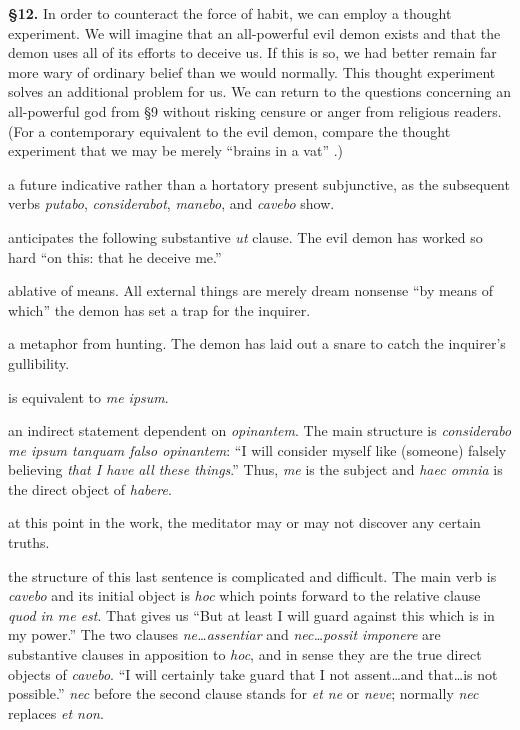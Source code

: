 \prenotes

\textbf{§12.} In order to counteract the force of habit, we can employ a thought experiment. We will imagine that an all-powerful evil demon exists and that the demon uses all of its efforts to deceive us. If this is so, we had better remain far more wary of ordinary belief than we would normally. This thought experiment solves an additional problem for us. We can return to the questions concerning an all-powerful god from §9 without risking censure or anger from religious readers. (For a contemporary equivalent to the evil demon, compare the thought experiment that we may be merely ``brains in a vat'' \parencite[5]{harman1973}.)

 a future indicative rather than a hortatory present subjunctive, as the subsequent verbs \textit{putabo}, \textit{considerabot}, \textit{manebo}, and \textit{cavebo} show.

 anticipates the following substantive \textit{ut} clause. The evil demon has worked so hard ``on this: that he deceive me.''

 ablative of means. All external things are merely dream nonsense ``by means of which'' the demon has set a trap for the inquirer.

 a metaphor from hunting. The demon has laid out a snare to catch the inquirer's gullibility.

 is equivalent to \textit{me ipsum}.

 an indirect statement dependent on \textit{opinantem}. The main structure is \textit{considerabo me ipsum tanquam falso opinantem}: ``I will consider myself like (someone) falsely believing \textit{that I have all these things}.'' Thus, \textit{me} is the subject and \textit{haec omnia} is the direct object of \textit{habere}.

 at this point in the work, the meditator may or may not discover any certain truths.

 the structure of this last sentence is complicated and difficult. The main verb is \textit{cavebo} and its initial object is \textit{hoc} which points forward to the relative clause \textit{quod in me est}. That gives us ``But at least I will guard against this which is in my power.'' The two clauses \textit{ne\dots assentiar} and \textit{nec\dots possit imponere} are substantive clauses in apposition to \textit{hoc}, and in sense they are the true direct objects of \textit{cavebo}. ``I will certainly take guard that I not assent\dots and that\dots is not possible.'' \textit{nec} before the second clause stands for \textit{et ne} or \textit{neve}; normally \textit{nec} replaces \textit{et non}.

